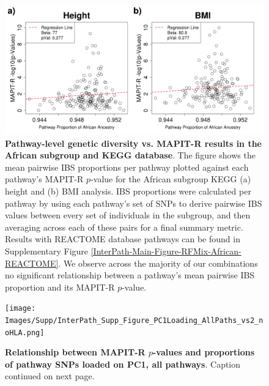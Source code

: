 \documentclass[12pt,a4paper]{article}
\begin{document}
\begin{figure}[htbp]
\centering
\includegraphics[scale=.35]{Images/Supp/InterPath_Supp_Figure_RFMix_vs2_African_KEGG_noHLA.png}
\caption[TBD]{\textbf{Pathway-level genetic diversity vs. MAPIT-R results in the African subgroup and KEGG database}. The figure shows the mean pairwise IBS proportions per pathway plotted against each pathway's MAPIT-R $p$-value for the African subgroup KEGG (a) height and (b) BMI analysis. IBS proportions were calculated per pathway by using each pathway's set of SNPs to derive pairwise IBS values between every set of individuals in the subgroup, and then averaging across each of these pairs for a final summary metric. Results with REACTOME database pathways can be found in Supplementary Figure \ref{InterPath-Main-Figure-RFMix-African-REACTOME}. We observe across the majority of our combinations no significant relationship between a pathway's mean pairwise IBS proportion and its MAPIT-R $p$-value.}
\label{InterPath-Supp-Figure-RFMix-African-KEGG}
\end{figure}
\clearpage

\setlength{\footskip}{3cm}
\begin{figure}[htbp]
\centering
\vspace*{-2cm}
\texttt{[image: Images/Supp/InterPath\_Supp\_Figure\_PC1Loading\_AllPaths\_vs2\_noHLA.png]}
\caption[TBD]{\textbf{Relationship between MAPIT-R $p$-values and proportions of pathway SNPs loaded on PC1, all pathways}. Caption continued on next page.}
\label{InterPath-Supp-Figure-PC1Loading-AllPaths}
\end{figure}
\clearpage
\setlength{\footskip}{1cm}
\end{document}

